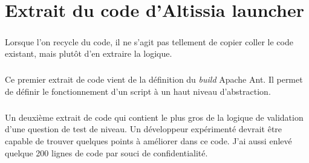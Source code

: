 \chapter{Extrait du code d'Altissia launcher}
\label{ch:altissia-launcher-code}

\paragraph{}
Lorsque l'on recycle du code, il ne s'agit pas tellement de copier coller le code existant, mais plutôt d'en extraire la logique.

\paragraph{}
Ce premier extrait de code vient de la définition du \textit{build}\fnmark{} Apache Ant.
Il permet de définir le fonctionnement d'un script à un haut niveau d'abstraction.



\paragraph{}
Un deuxième extrait de code qui contient le plus gros de la logique de validation d'une question de test de niveau.
Un développeur expérimenté devrait être capable de trouver quelques points à améliorer dans ce code.
J'ai aussi enlevé quelque 200 lignes de code par souci de confidentialité.


